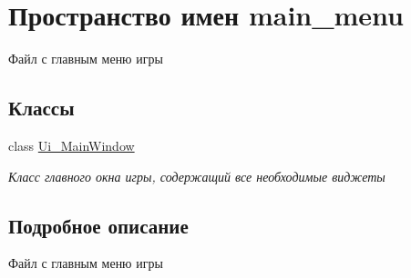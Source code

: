 \hypertarget{namespacemain__menu}{}\section{Пространство имен main\+\_\+menu}
\label{namespacemain__menu}


Файл с главным меню игры  


\subsection*{Классы}
\begin{DoxyCompactItemize}
\item 
class \mbox{\hyperlink{classmain__menu_1_1_ui___main_window}{Ui\+\_\+\+Main\+Window}}
\begin{DoxyCompactList}\small\item\em Класс главного окна игры, содержащий все необходимые виджеты \end{DoxyCompactList}\end{DoxyCompactItemize}


\subsection{Подробное описание}
Файл с главным меню игры 

